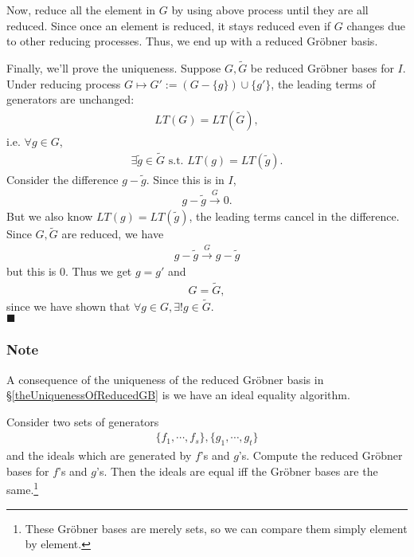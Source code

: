 \documentclass[11pt]{book}
\begin{document}
Now, reduce all the element in $G$ by using above process until they are all reduced.
Since once an element is reduced, it stays reduced even if $G$ changes due to other reducing processes.
Thus, we end up with a reduced Gr\"obner basis.

Finally, we'll prove the uniqueness.
Suppose $G, \tilde{G}$ be reduced Gr\"obner bases for $I$.
Under reducing process $G \mapsto G' := (G-\{g\}) \cup \{g' \}$, the leading terms of generators are unchanged:
\begin{eqnarray}
LT(G) = LT(\tilde{G}),
\end{eqnarray}
i.e. $\forall g \in G$, 
\begin{eqnarray}
\exists \tilde{g} \in \tilde{G} \text{ s.t. } LT(g) = LT(\tilde{g}).
\end{eqnarray}
Consider the difference $g - \tilde{g}$.
Since this is in $I$,
\begin{eqnarray}
g -\tilde{g} \stackrel{G}{\to} 0.
\end{eqnarray}
But we also know $LT(g) = LT(\tilde{g})$, the leading terms cancel in the difference.
Since $G,\tilde{G}$ are reduced, we have
\begin{eqnarray}
g -\tilde{g} \stackrel{G}{\to} g -\tilde{g}
\end{eqnarray}
but this is $0$.
Thus we get $g = g'$ and 
\begin{eqnarray}
G = \tilde{G},
\end{eqnarray}
since we have shown that $\forall g \in G, \exists! g \in \tilde{G}$.\\
$\blacksquare$










\subsubsection{Note}
A consequence of the uniqueness of the reduced Gr\"obner basis in \S\ref{theUniquenessOfReducedGB} is we have an ideal equality algorithm.

Consider two sets of generators
\begin{eqnarray}
\{f_1, \cdots, f_s\}, \{g_1, \cdots, g_t\}
\end{eqnarray}
and the ideals which are generated by $f$'s and $g$'s.
Compute the reduced Gr\"obner bases for $f$'s and $g$'s.
Then the ideals are equal iff the Gr\"obner bases are the same.\footnote{These Gr\"obner bases are merely sets, so we can compare them simply element by element.}
\end{document}
